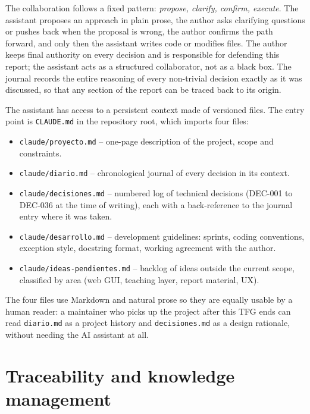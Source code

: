 The collaboration follows a fixed pattern: \emph{propose, clarify,
confirm, execute}. The assistant proposes an approach in plain
prose, the author asks clarifying questions or pushes back when the
proposal is wrong, the author confirms the path forward, and only
then the assistant writes code or modifies files. The author keeps
final authority on every decision and is responsible for defending
this report; the assistant acts as a structured collaborator, not as
a black box. The journal records the entire reasoning of every
non-trivial decision exactly as it was discussed, so that any
section of the report can be traced back to its origin.

The assistant has access to a persistent context made of versioned
files. The entry point is \texttt{CLAUDE.md} in the repository root,
which imports four files:

\begin{itemize}
  \item \texttt{claude/proyecto.md} -- one-page description of the
        project, scope and constraints.
  \item \texttt{claude/diario.md} -- chronological journal of every
        decision in its context.
  \item \texttt{claude/decisiones.md} -- numbered log of technical
        decisions (DEC-001 to DEC-036 at the time of writing), each
        with a back-reference to the journal entry where it was
        taken.
  \item \texttt{claude/desarrollo.md} -- development guidelines:
        sprints, coding conventions, exception style, docstring
        format, working agreement with the author.
  \item \texttt{claude/ideas-pendientes.md} -- backlog of ideas
        outside the current scope, classified by area (web GUI,
        teaching layer, report material, UX).
\end{itemize}

The four files use Markdown and natural prose so they are equally
usable by a human reader: a maintainer who picks up the project
after this TFG ends can read \texttt{diario.md} as a project history
and \texttt{decisiones.md} as a design rationale, without needing
the AI assistant at all.

\section{Traceability and knowledge management}
\label{sec:trazabilidad}

